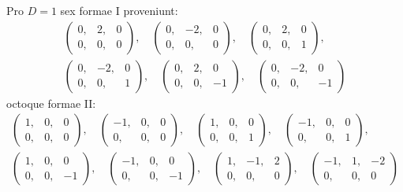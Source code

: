 \documentclass[12pt,a4paper]{article}
\theoremstyle{plain}
\theoremstyle{definition}
\theoremstyle{remark}
\begin{document}
\begin{otherlanguage}{latin}
Pro $D = 1$ sex formae I proveniunt:
\begin{gather*}
\begin{pmatrix} 0, & 2, & 0 \\ 0, & 0, & 0 \end{pmatrix}, \quad
\begin{pmatrix} 0, & -2, & 0 \\ 0, & 0, & 0 \end{pmatrix}, \quad
\begin{pmatrix} 0, & 2, & 0 \\ 0, & 0, & 1 \end{pmatrix}, \\
\begin{pmatrix} 0, & -2, & 0 \\ 0, & 0, & 1 \end{pmatrix}, \quad
\begin{pmatrix} 0, & 2, & 0 \\ 0, & 0, & -1 \end{pmatrix}, \quad
\begin{pmatrix} 0, & -2, & 0 \\ 0, & 0, & -1 \end{pmatrix}
\end{gather*}
octoque formae II:
\begin{gather*}
\begin{pmatrix} 1, & 0, & 0 \\ 0, & 0, & 0 \end{pmatrix}, \quad
\begin{pmatrix} -1, & 0, & 0 \\ 0, & 0, & 0 \end{pmatrix}, \quad
\begin{pmatrix} 1, & 0, & 0 \\ 0, & 0, & 1 \end{pmatrix}, \quad
\begin{pmatrix} -1, & 0, & 0 \\ 0, & 0, & 1 \end{pmatrix}, \\
\begin{pmatrix} 1, & 0, & 0 \\ 0, & 0, & -1 \end{pmatrix}, \quad
\begin{pmatrix} -1, & 0, & 0 \\ 0, & 0, & -1 \end{pmatrix}, \quad
\begin{pmatrix} 1, & -1, & 2 \\ 0, & 0, & 0 \end{pmatrix}, \quad
\begin{pmatrix} -1, & 1, & -2 \\ 0, & 0, & 0 \end{pmatrix}
\end{gather*}


\end{otherlanguage}
\end{document}

